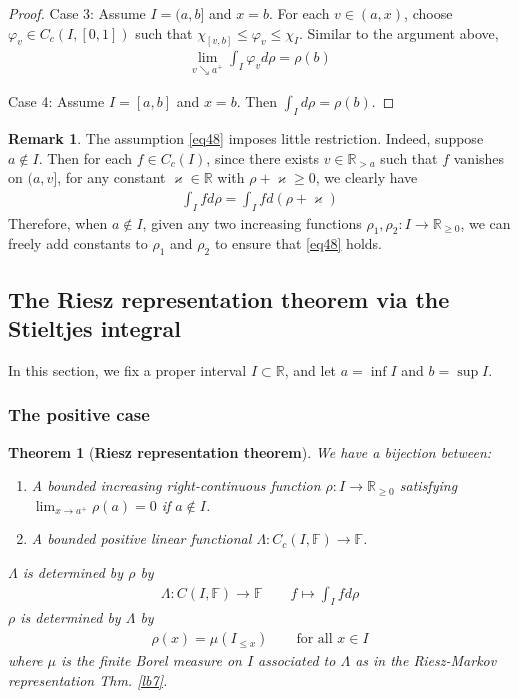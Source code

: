 \documentclass[12pt,b5paper,notitlepage]{article}
\theoremstyle{definition}
\newtheorem{rem}[df]{Remark}
\theoremstyle{plain}
\newtheorem{thm}[df]{Theorem}
\newcommand{\Rbb}{\mathbb R}
\newcommand{\Fbb}{\mathbb F}
\newcommand{\dps}{\displaystyle}
\numberwithin{equation}{section}
\begin{document}
\begin{proof}
Case 3: Assume $I=(a,b]$ and $x=b$.  For each $v\in(a,x)$, choose $\varphi_v\in C_c(I,[0,1])$ such that $\chi_{[v,b]}\leq \varphi_v\leq \chi_I$. Similar to the argument above,
\begin{align*}
\lim_{v\searrow a^+}\int_I\varphi_vd\rho=\rho(b)
\end{align*}

Case 4: Assume $I=[a,b]$ and $x=b$. Then $\dps\int_I d\rho=\rho(b)$.
\end{proof}


\begin{rem}\label{lb93}
The assumption \eqref{eq48} imposes little restriction. Indeed, suppose $a\notin I$. Then for each $f\in C_c(I)$, since there exists $v\in\Rbb_{>a}$ such that $f$ vanishes on $(a,v]$, for any constant $\varkappa\in\Rbb$ with $\rho+\varkappa\geq0$, we clearly have
\begin{align}
\int_I fd\rho=\int_I fd(\rho+\varkappa)
\end{align}
Therefore, when $a\notin I$, given any two increasing functions $\rho_1,\rho_2:I\rightarrow\Rbb_{\geq0}$, we can freely add constants to $\rho_1$ and $\rho_2$ to ensure that \eqref{eq48} holds.
\end{rem}



\subsection{The Riesz representation theorem via the Stieltjes integral}

In this section, we fix a proper interval $I\subset\Rbb$, and let $a=\inf I$ and $b=\sup I$.

\subsubsection{The positive case}




\begin{thm}[\textbf{Riesz representation theorem}]\label{lb9}
We have a bijection between:
\begin{enumerate}[label=(\alph*)]
\item A bounded increasing right-continuous function $\rho:I\rightarrow\Rbb_{\geq0}$ satisfying $\lim_{x\rightarrow a^+}\rho(a)=0$ if $a\notin I$.
\item A bounded positive linear functional $\Lambda:C_c(I,\Fbb)\rightarrow\Fbb$.
\end{enumerate}
$\Lambda$ is determined by $\rho$ by
\begin{align}\label{eq43}
\Lambda:C(I,\Fbb)\rightarrow\Fbb\qquad f\mapsto\int_I fd\rho
\end{align}
$\rho$ is determined by $\Lambda$ by 
\begin{align}\label{eq42}
\rho(x)=\mu(I_{\leq x})\qquad\text{for all }x\in I
\end{align}
where $\mu$ is the finite Borel measure on $I$ associated to $\Lambda$ as in the Riesz-Markov representation Thm. \ref{lb7}. 
\end{thm}
\end{document}
